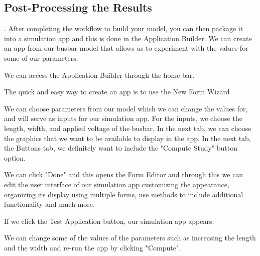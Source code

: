 
\subsection{Post-Processing the Results}.
After completing the workflow to build your model, you can then package it into a simulation app and this is done in the Application Builder. We can create an app from our busbar model that allows us to experiment with the values for some of our parameters.

We can access the Application Builder through the home bar.


The quick and easy way to create an app is to use the New Form Wizard


We can choose parameters from our model which we can change the values for, and will serve as inputs for our simulation app. For the inputs, we choose the length, width, and applied voltage of the busbar. In the next tab, we can choose the graphics that we want to be available to display in the app. In the next tab, the Buttons tab, we definitely want to include the "Compute Study" button option.

We can click "Done" and this opens the Form Editor and through this we can edit the user interface of our simulation app customizing the appearance, organizing its display using multiple forms, use methods to include additional functionality and much more.


If we click the Test Application button, our simulation app appears.


We can change some of the values of the parameters such as increasing the length and the width and re-run the app by clicking "Compute".